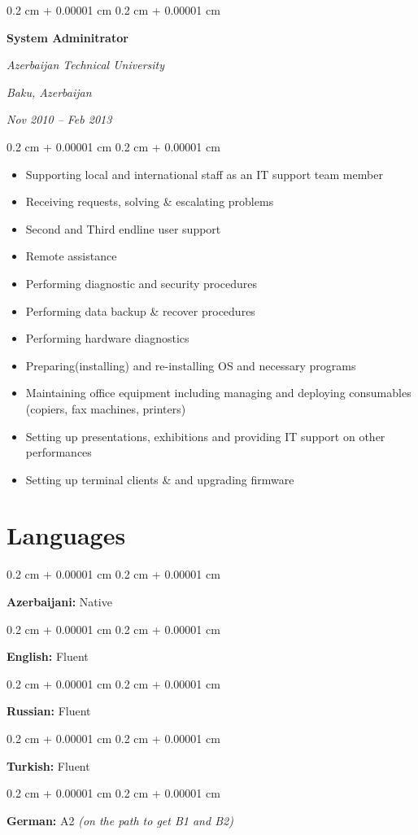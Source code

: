 \documentclass[10pt, letterpaper]{article}
\newenvironment{highlights}{
  \begin{itemize}[
        topsep=0.10 cm,
        parsep=0.10 cm,
        partopsep=0pt,
        itemsep=0pt,
        leftmargin=0.4 cm + 10pt
      ]
    }{
  \end{itemize}
} %
\newenvironment{onecolentry}{
  \begin{adjustwidth}{
      0.2 cm + 0.00001 cm
    }{
      0.2 cm + 0.00001 cm
    }
  }{
  \end{adjustwidth}
} %
\newenvironment{twocolentry}[2][]{
  \onecolentry
  \def\secondColumn{#2}
  \setcolumnwidth{\fill, 4.5 cm}
  \begin{paracol}{2}
  }{
    \switchcolumn \raggedleft \secondColumn
  \end{paracol}
  \endonecolentry
} %
\begin{document}
\vspace{0.3 cm}

\begin{twocolentry}{
    \textit{Baku, Azerbaijan}

  \textit{Nov 2010 – Feb 2013}}
  \textbf{System Adminitrator}

  \textit{Azerbaijan Technical University}
\end{twocolentry}

\vspace{0.2 cm}
\begin{onecolentry}
  \begin{highlights}
  \item Supporting local and international staff as an IT support team member
  \item Receiving requests, solving \& escalating problems
  \item Second and Third end\-line user support
  \item Remote assistance
  \item Performing diagnostic and security procedures
  \item Performing data backup \& recover procedures
  \item Performing hardware diagnostics
  \item Preparing(installing) and re-installing OS and necessary programs
  \item Maintaining office equipment including managing and deploying
    consumables (copiers, fax machines, printers)
  \item Setting up presentations, exhibitions and providing IT
    support on other performances
  \item Setting up terminal clients \& and upgrading firmware
  \end{highlights}
\end{onecolentry}
\vspace{0.20 cm}
\section{Languages}
\begin{onecolentry}
  \textbf{Azerbaijani:} Native
\end{onecolentry}
\begin{onecolentry}
  \textbf{English:} Fluent
\end{onecolentry}
\begin{onecolentry}
  \textbf{Russian:} Fluent
\end{onecolentry}
\begin{onecolentry}
  \textbf{Turkish:} Fluent
\end{onecolentry}
\begin{onecolentry}
  \textbf{German:} A2 \textit{(on the path to get B1 and B2)}
\end{onecolentry}
\end{document}

